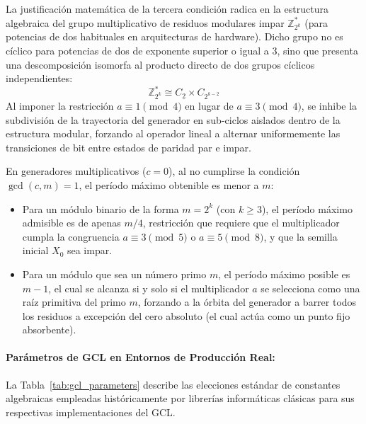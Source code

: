 \documentclass{article}
\begin{document}
La justificación matemática de la tercera condición radica en la estructura algebraica del grupo multiplicativo de residuos modulares impar $\mathbb{Z}_{2^k}^*$ (para potencias de dos habituales en arquitecturas de hardware). Dicho grupo no es cíclico para potencias de dos de exponente superior o igual a 3, sino que presenta una descomposición isomorfa al producto directo de dos grupos cíclicos independientes:
\begin{equation}
    \mathbb{Z}_{2^k}^* \cong C_2 \times C_{2^{k-2}}
\end{equation}
Al imponer la restricción $a \equiv 1 \pmod{4}$ en lugar de $a \equiv 3 \pmod{4}$, se inhibe la subdivisión de la trayectoria del generador en sub-ciclos aislados dentro de la estructura modular, forzando al operador lineal a alternar uniformemente las transiciones de bit entre estados de paridad par e impar.

En generadores multiplicativos ($c = 0$), al no cumplirse la condición $\gcd(c, m) = 1$, el período máximo obtenible es menor a $m$:
\begin{itemize}
    \item Para un módulo binario de la forma $m = 2^k$ (con $k \ge 3$), el período máximo admisible es de apenas $m/4$, restricción que requiere que el multiplicador cumpla la congruencia $a \equiv 3 \pmod{5}$ o $a \equiv 5 \pmod{8}$, y que la semilla inicial $X_0$ sea impar.
    \item Para un módulo que sea un número primo $m$, el período máximo posible es $m - 1$, el cual se alcanza si y solo si el multiplicador $a$ se selecciona como una raíz primitiva del primo $m$, forzando a la órbita del generador a barrer todos los residuos a excepción del cero absoluto (el cual actúa como un punto fijo absorbente).
\end{itemize}

\paragraph{Parámetros de GCL en Entornos de Producción Real:}
La Tabla~\ref{tab:gcl_parameters} describe las elecciones estándar de constantes algebraicas empleadas históricamente por librerías informáticas clásicas para sus respectivas implementaciones del GCL.
\end{document}
